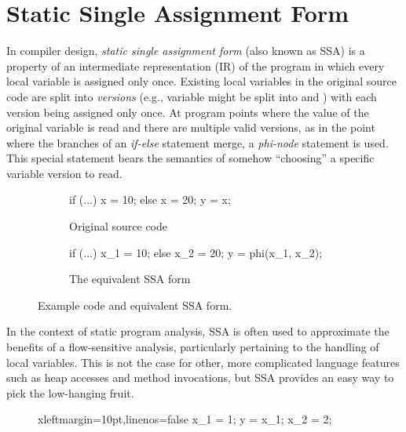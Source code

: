 \section{Static Single Assignment Form}
\label{sec:back:ssa}

In compiler design, \emph{static single assignment form} (also known as SSA) is a property of an intermediate representation (IR) of the program in which every local variable is assigned only once. Existing local variables in the original source code are split into \emph{versions} (e.g., variable  might be split into  and ) with each version being assigned only once. At program points where the value of the original variable is read and there are multiple valid versions, as in the point where the branches of an \emph{if-else} statement merge, a \emph{phi-node} statement is used. This special statement bears the semantics of somehow ``choosing'' a specific variable version to read.

\begin{figure}[h]
\begin{subfigure}{.45\textwidth}
\begin{javacode}
if (...) x = 10;
else x = 20;
y = x;
\end{javacode}
\caption*{Original source code}
\end{subfigure}%
\hfill
\begin{subfigure}{.45\textwidth}
\begin{javacode}
if (...) x_1 = 10;
else x_2 = 20;
y = phi(x_1, x_2);
\end{javacode}
\caption*{The equivalent SSA form}
\end{subfigure}
\caption[Code snippet illustrating SSA form]{Example code and equivalent SSA form.}
\end{figure}

In the context of static program analysis, SSA is often used to approximate the benefits of a flow-sensitive analysis, particularly pertaining to the handling of local variables. This is not the case for other, more complicated language features such as heap accesses and method invocations, but SSA provides an easy way to pick the low-hanging fruit.

\setlength\intextsep{15pt}
\begin{figure}
\centering
\vspace{-20pt}
\begin{javacode*}{xleftmargin=10pt,linenos=false}
x_1 = 1;
y = x_1;
x_2 = 2;
\end{javacode*}
\end{figure}

